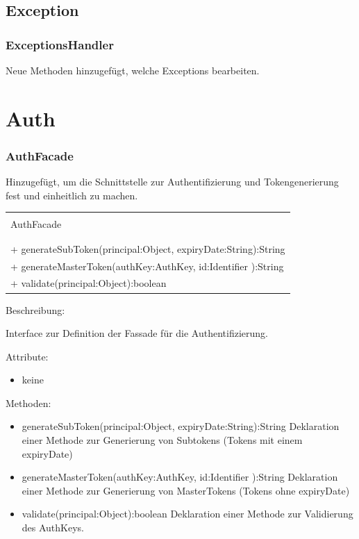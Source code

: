 \documentclass[a4paper,20pt,oneside]{book}
\begin{document}
	\subsection{Exception}
	\subsubsection{ExceptionsHandler} 
	Neue Methoden hinzugefügt, welche Exceptions bearbeiten.
	\section{Auth} 
	
	\subsubsection{AuthFacade}
	
	Hinzugefügt, um die Schnittstelle zur Authentifizierung und Tokengenerierung fest und einheitlich zu machen.	
	
	\vspace{0.5cm}
	\centering
	\begin{tabular}{|l|}
	\hline \\
	AuthFacade \\ \hline 
	\\ \hline \\
	+ generateSubToken(principal:Object, expiryDate:String):String\\ 
   + generateMasterToken(authKey:AuthKey, id:Identifier ):String\\
   + validate(principal:Object):boolean
 \\ \hline
	\end{tabular}
		 
	\vspace{0.5cm}
	\raggedright
	Beschreibung:
	
	Interface zur Definition der Fassade für die Authentifizierung.
	
	\vspace{0.5cm}
	Attribute:
	\begin{itemize}
	\item keine
	\end{itemize}
	
	Methoden:
	\begin{itemize}
	\item generateSubToken(principal:Object, expiryDate:String):String\linebreak
	Deklaration einer Methode zur Generierung von Subtokens (Tokens mit einem expiryDate)
	\item generateMasterToken(authKey:AuthKey, id:Identifier ):String\linebreak
Deklaration einer Methode zur Generierung von MasterTokens (Tokens ohne expiryDate)
	\item validate(principal:Object):boolean\linebreak
	Deklaration einer Methode zur Validierung des AuthKeys.
	\end{itemize}	
	
\end{document}
